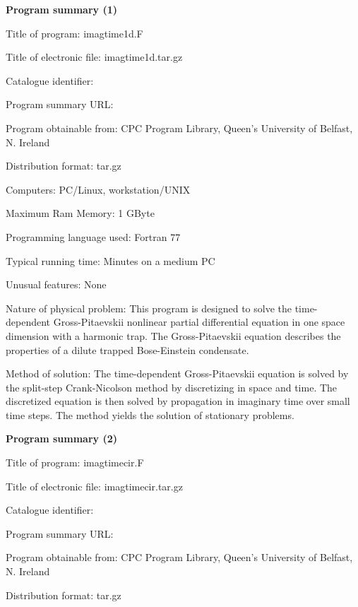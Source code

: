 \documentclass[onecolumn]{elsart3p}
\begin{document}
\maketitle

{\bf Program summary (1)}

Title of program: imagtime1d.F

Title of electronic file: imagtime1d.tar.gz

Catalogue identifier:

Program summary URL: 

Program obtainable from: CPC Program Library, Queen's University of 
Belfast, N. Ireland

Distribution format: tar.gz

Computers: PC/Linux, workstation/UNIX

Maximum Ram Memory: 1 GByte

Programming language used: Fortran 77




Typical running time: Minutes on a medium PC

Unusual features: None

Nature of physical problem: This program is designed to solve the
time-dependent Gross-Pitaevskii nonlinear partial differential equation
in one space dimension with a harmonic trap. The Gross-Pitaevskii
equation describes the properties of a dilute trapped Bose-Einstein
condensate.


Method of solution: The time-dependent Gross-Pitaevskii equation is 
solved by the split-step Crank-Nicolson method by discretizing in space 
and time. The discretized equation is then solved by propagation in 
imaginary time over small time steps.  The method yields the solution of 
stationary problems.  


{\bf Program summary (2)}

Title of program: imagtimecir.F

Title of electronic file: imagtimecir.tar.gz


Catalogue identifier:

Program summary URL: 

Program obtainable from: CPC Program Library, Queen's University of 
Belfast, N. Ireland

Distribution format: tar.gz
\end{document}
